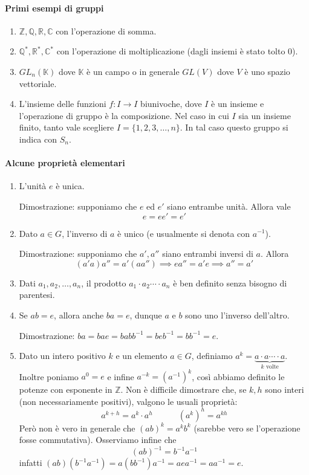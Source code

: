 \documentclass[11pt]{article}
\theoremstyle{plain}
\theoremstyle{definition}
\theoremstyle{remark}
\newcommand{\K}{\mathbb{K}}
\newcommand{\Z}{\mathbb{Z}}
\begin{document}
\paragraph{Primi esempi di gruppi}
\begin{enumerate}
	\item $\mathbb{Z}, \mathbb{Q}, \mathbb{R}, \mathbb{C}$ con l'operazione di somma.
	\item $\mathbb{Q}^*, \mathbb{R}^*, \mathbb{C}^*$ con l'operazione di moltiplicazione (dagli insiemi è stato tolto $0$).
	\item $GL_n(\mathbb{\K})$ dove $\K$ è un campo o in generale $GL(V)$ dove $V$ è uno spazio vettoriale.
	\item L'insieme delle funzioni $f:I\to I $ biunivoche, dove $I$ è un insieme e l'operazione di gruppo è la composizione. Nel caso in cui $I$ sia un insieme finito, tanto vale scegliere $I = \{1,2,3,\ldots, n\}$. In tal caso questo gruppo si indica con $S_n$.
\end{enumerate}

\paragraph{Alcune proprietà elementari}
\begin{enumerate}
	\item L'unità $e$ è unica.

	Dimostrazione: supponiamo che $e$ ed $e'$ siano entrambe unità. Allora vale
	\[e = ee' = e' \]
	\item Dato $a\in G$, l'inverso di $a$ è unico (e usualmente si denota con $a^{-1}$).

	Dimostrazione: supponiamo che $a', a''$ siano entrambi inversi di $a$. Allora
	\[(a' a)a'' = a'(aa'') \implies e a'' = a' e \implies a'' = a' \]
	
	\item Dati $a_1, a_2, \ldots, a_n$, il prodotto $a_1\cdot a_2 \cdots\cdot a_n$ è ben definito senza bisogno di parentesi.
	
	\item Se $ab = e$, allora anche $ba = e$, dunque $a$ e $b$ sono uno l'inverso dell'altro.

	Dimostrazione: $ba = bae = babb^{-1} = beb^{-1} = bb^{-1} = e$.

	\item Dato un intero positivo $k$ e un elemento $a\in G$, definiamo $a^k=\underbrace{a\cdot a \cdots\cdot a}_{k\text{ volte}}$.
	Inoltre poniamo $a^0 = e$ e infine $a^{-k} = (a^{-1})^k$, così abbiamo definito le potenze con esponente in $\Z$.
	Non è difficile dimostrare che, se $k,h$ sono interi (non necessariamente positivi), valgono le usuali proprietà:
	\[a^{k+h} = a^k \cdot a^h \quad\quad\quad (a^k)^h = a^{kh} \]
	Però non è vero in generale che $(ab)^k = a^kb^k$ (sarebbe vero se l'operazione fosse commutativa). Osserviamo infine che
	\[ (ab)^{-1} = b^{-1}a^{-1}\]
	infatti $(ab)(b^{-1} a^{-1}) = a(bb^{-1})a^{-1} = aea^{-1} = aa^{-1} = e$.
\end{enumerate}
\end{document}
